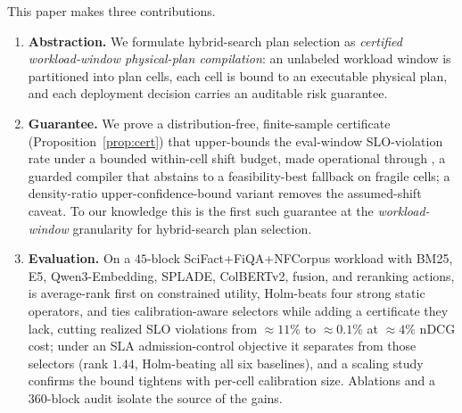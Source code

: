 This paper makes three contributions.
\begin{enumerate}
  \item \textbf{Abstraction.} We formulate hybrid-search plan selection as \emph{certified workload-window physical-plan compilation}: an unlabeled workload window is partitioned into plan cells, each cell is bound to an executable physical plan, and each deployment decision carries an auditable risk guarantee.
  \item \textbf{Guarantee.} We prove a distribution-free, finite-sample certificate (Proposition~\ref{prop:cert}) that upper-bounds the eval-window SLO-violation rate under a bounded within-cell shift budget, made operational through \CWC{}, a guarded compiler that abstains to a feasibility-best fallback on fragile cells; a density-ratio upper-confidence-bound variant removes the assumed-shift caveat. To our knowledge this is the first such guarantee at the \emph{workload-window} granularity for hybrid-search plan selection.
  \item \textbf{Evaluation.} On a $45$-block SciFact+FiQA+NFCorpus workload with BM25, E5, Qwen3-Embedding, SPLADE, ColBERTv2, fusion, and reranking actions, \CWC{} is average-rank first on constrained utility, Holm-beats four strong static operators, and ties calibration-aware selectors while adding a certificate they lack, cutting realized SLO violations from $\approx11\%$ to $\approx0.1\%$ at $\approx4\%$ nDCG cost; under an SLA admission-control objective it separates from those selectors (rank $1.44$, Holm-beating all six baselines), and a scaling study confirms the bound tightens with per-cell calibration size. Ablations and a $360$-block audit isolate the source of the gains.
\end{enumerate}
